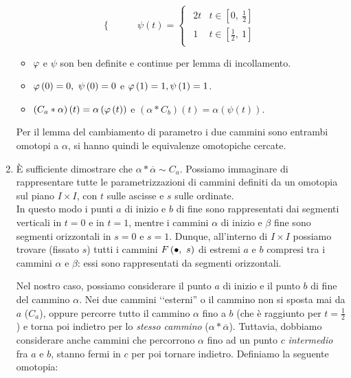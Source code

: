 \begin{demonstration}
\begin{enumerate}[label=\Roman*]
\begin{equation*}
\begin{cases}
	\end{cases}
\qquad	\psi\left(t\right)=
\begin{cases}
	\begin{array}{ll}
		2t&t\in\left[0,\ \frac{1}{2}\right]\\
		1&t\in\left[\frac{1}{2},\ 1\right]
	\end{array}
\end{cases}
\end{equation*}
\begin{itemize}
	\item $\oldphi$ e $\psi$ son ben definite e continue per lemma di incollamento.
	\item $\oldphi\left(0\right)=0,\ \psi\left(0\right)=0$ e $\oldphi\left(1\right)=1,\psi\left(1\right)=1 $.
	\item $\left(C_a\ast \alpha\right)\left(t\right)=\alpha\left(\oldphi\left(t\right)\right)$ e $\left(\alpha\ast C_b\right)\left(t\right)=\alpha\left(\psi\left(t\right)\right)$.
\end{itemize}
Per il lemma del cambiamento di parametro i due cammini sono entrambi omotopi a $\alpha$, si hanno quindi le equivalenze omotopiche cercate.
\item È sufficiente dimostrare che $\alpha\ast\overline{\alpha}\sim C_a$. Possiamo immaginare di rappresentare tutte le parametrizzazioni di cammini definiti da un omotopia sul piano $I\times I$, con $t$ sulle ascisse e $s$ sulle ordinate.\\
In questo modo i punti $a$ di inizio e $b$ di fine sono rappresentati dai segmenti verticali in $t=0$ e in $t=1$, mentre i cammini $\alpha$ di inizio e $\beta$ fine sono segmenti orizzontali in $s=0$ e $s=1$. Dunque, all'interno di $I\times I$ possiamo  trovare (fissato $s$) tutti i cammini $F\left(\bullet,\ s\right)$ di estremi $a$ e $b$ compresi tra i cammini $\alpha$ e $\beta$: essi sono rappresentati da segmenti orizzontali.\\
\begin{minipage}{.62\linewidth}
Nel nostro caso, possiamo considerare il punto $a$ di inizio e il punto $b$ di fine del cammino $\alpha$. Nei due cammini ‘‘esterni'' o il cammino non si sposta mai da $a$ ($C_a$), oppure percorre tutto il cammino $\alpha$ fino a $b$ (che è raggiunto per $t=\frac{1}{2}$) e torna poi indietro per lo \textit{stesso cammino} ($\alpha\ast\overline{\alpha}$). Tuttavia, dobbiamo considerare anche cammini che percorrono $\alpha$ fino ad un punto $c$ \textit{intermedio} fra $a$ e $b$, stanno fermi in $c$ per poi tornare indietro. Definiamo la seguente omotopia:

\end{minipage}
\end{enumerate}
\end{demonstration}
